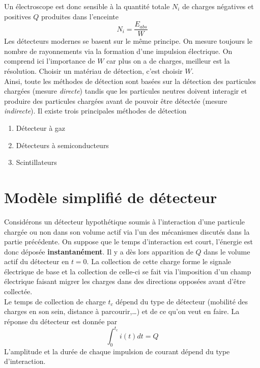 Un électroscope est donc sensible à la quantité totale $N_i$ de
charges négatives et positives $Q$ produites dans l'enceinte
\begin{equation}
N_i=\frac{E_{abs}}{W}
\end{equation}
Les détecteurs modernes se basent sur le même principe. On mesure
toujours le nombre de rayonnements via la formation d'une impulsion
électrique. On comprend ici l'importance de $W$ car plus on a de 
charges, meilleur est la résolution. Choisir un matériau de 
détection, c'est choisir $W$.\\

Ainsi, toute les méthodes de détection sont basées sur la détection
des particules chargées (mesure \textit{directe}) tandis que les particules
neutres doivent interagir et produire des particules chargées 
avant de pouvoir être détectée (mesure \textit{indirecte}). Il 
existe trois principales méthodes de détection
\begin{enumerate}
\item Détecteur à gaz
\item Détecteurs à semiconducteurs
\item Scintillateurs
\end{enumerate}

\section{Modèle simplifié de détecteur}%
Considérons  un détecteur hypothétique soumis à l'interaction d'une
particule chargée ou non dans son volume actif via l'un des
mécanismes discutés dans la partie précédente. On suppose que le 
temps d'interaction est court, l'énergie est donc déposée 
\textbf{instantanément}. Il y a dès lors apparition de $Q$ dans le
volume actif du détecteur en $t=0$. La collection de cette charge 
forme le signale électrique de base et la collection de celle-ci 
se fait via l'imposition d'un champ électrique faisant migrer les
charges dans des directions opposées avant d'être collectée.\\

Le temps de collection de charge $t_c$ dépend du type de détecteur
(mobilité des charges en son sein, distance à parcourir,\dots) et
de ce qu'on veut en faire. La réponse du détecteur est donnée par
\begin{equation}
\int_0^{t_c} i(t) dt=Q
\end{equation}
L'amplitude et la durée de chaque impulsion de courant dépend du 
type d'interaction.\\

